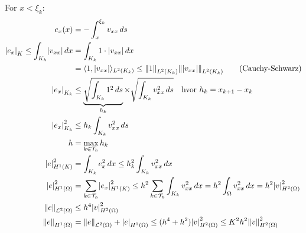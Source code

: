 For $x < \xi_k$:
\begin{align*}
    e_x(x)                                           & =-\int_{x}^{\xi_k} v_{xx} \, ds                                                                                                                                                \\
    \abs*{e_x}_K \leq \int_{K_k} \abs*{v_{xx}} \, dx & = \int_{K_k} 1\cdot \abs*{v_{xx}} \, dx                                                                                                                                        \\
                                                     & = \inner{1, \abs*{v_{xx}}}_{L^2(K_k)} \leq \norm*{1}_{L^2(K_k)} \norm*{\abs*{v_{xx}}}_{L^2(K_k)} \tag{Cauchy-Schwarz}                                                          \\
    \abs*{e_x}_{K_k}                                 & \leq \underbrace{\sqrt{\int_{K_k} 1^2 \, ds}}_{h_k} \times \sqrt{\int_{K_k} v_{xx}^2 \, ds} \quad \text{hvor } h_k = x_{k+1} - x_k                                             \\
    \abs*{e_x}_{K_k}^2                               & \leq h_k \int_{K_k} v_{xx}^2 \, ds                                                                                                                                             \\
    h                                                & = \max_{k \in \mathcal{T}_h} h_k                                                                                                                                               \\
    \abs*{e}_{H^1(K)}^2                              & = \int_{K_k} e_x^2 \, dx \leq h_k^2 \int_{K_k} v_{xx}^2 \, dx                                                                                                                  \\
    \abs*{e}_{H^1(\Omega)}^2                         & = \sum_{k\in\mathcal{T}_h} \abs*{e_x}_{H^1(K)}^2 \leq h^2 \sum_{k\in\mathcal{T}_h} \int_{K_k} v_{xx}^2 \, dx = h^2 \int_{\Omega} v_{xx}^2 \, dx = h^2 \abs*{v}_{H^2(\Omega)}^2 \\
    \norm*{e}_{\mathcal{L}^2(\Omega)}                & \leq h^4 \abs*{v}_{H^2(\Omega)}^2                                                                                                                                              \\
    \norm*{e}_{H^1(\Omega)}                          & = \norm*{e}_{\mathcal{L}^2(\Omega)} + \abs*{e}_{H^1(\Omega)} \leq (h^4 + h^2) \abs*{v}_{H^2(\Omega)}^2 \leq K^2 h^2 \norm*{v}_{H^2(\Omega)}^2                                  \\
\end{align*}


